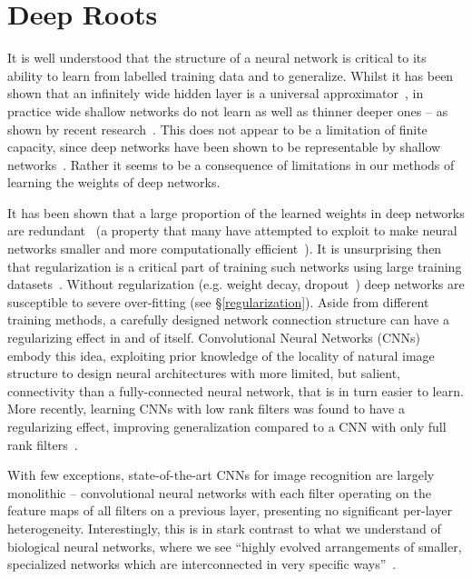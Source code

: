 \documentclass[thesis]{subfiles}
\begin{document}
	
	\chapter{Deep Roots}
	\label{deeproots}
	
	
	It is well understood that the structure of a neural network is critical to its ability to learn from labelled training data and to generalize. Whilst it has been shown that an infinitely wide hidden layer is a universal approximator~\citep{hornik89a}, in practice wide shallow networks do not learn as well as thinner deeper ones -- as shown by recent research~\citep{Krizhevsky2012imanet,Szegedy2014going,Simonyan2014verydeep,He2015}.
	This does not appear to be a limitation of finite capacity, since deep networks have been shown to be representable by shallow networks~\citep{Ba2013dothey}. Rather it seems to be a consequence of limitations in our methods of learning the weights of deep networks.
	
	It has been shown that a large proportion of the learned weights in deep networks are redundant~\citep{Denil2013predicting} (a property that many have attempted to exploit to make neural networks smaller and more computationally efficient~\cite{Szegedy2014going,Denton2014efficient}). It is unsurprising then that regularization is a critical part of training such networks using large training datasets~\cite{Krizhevsky2012imanet}. Without regularization (e.g. weight decay, dropout~\cite{1207.0580v1}) deep networks are susceptible to severe over-fitting (see \S\ref{regularization}). Aside from different training methods, a carefully designed network connection structure can have a regularizing effect in and of itself. Convolutional Neural Networks (CNNs)~\citep{Fuk80,Lecun1998} embody this idea, exploiting prior knowledge of the locality of natural image structure to design neural architectures with more limited, but salient, connectivity than a fully-connected neural network, that is in turn easier to learn. More recently, learning CNNs with low rank filters was found to have a regularizing effect, improving generalization compared to a CNN with only full rank filters~\citep{Ioannou2016}.
	
	With few exceptions, state-of-the-art CNNs for image recognition are largely monolithic -- convolutional neural networks with each filter operating on the feature maps of all filters on a previous layer, presenting no significant per-layer heterogeneity. Interestingly, this is in stark contrast to what we understand of biological neural networks, where we see ``highly evolved arrangements of smaller, specialized networks which are interconnected in very specific ways''~\citep{minsky1988perceptrons}.
	
\end{document}
